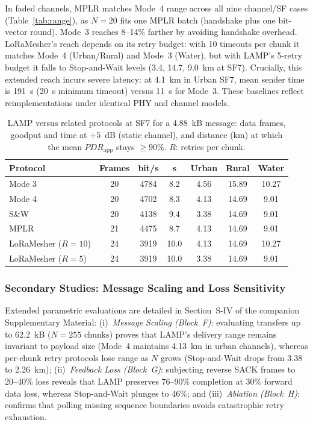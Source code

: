 \documentclass[journal]{IEEEtran}
\begin{document}
In faded channels, MPLR matches Mode~4 range across all nine channel/SF cases (Table~\ref{tab:range}), as $N=20$ fits one MPLR batch (handshake plus one bit-vector round). Mode~3 reaches 8--14\% farther by avoiding handshake overhead. LoRaMesher's reach depends on its retry budget: with 10 timeouts per chunk it matches Mode~4 (Urban/Rural) and Mode~3 (Water), but with LAMP's 5-retry budget it falls to Stop-and-Wait levels (3.4, 14.7, 9.0~km at SF7). Crucially, this extended reach incurs severe latency: at 4.1~km in Urban SF7, mean sender time is 191~s (20~s minimum timeout) versus 11~s for Mode~3. These baselines reflect reimplementations under identical PHY and channel models.

\begin{table}[htpb]
\centering
\caption{\ac{LAMP} versus related protocols at SF7 for a 4.88~kB message: data frames, goodput and time at $+5$~dB (static channel), and distance (km) at which the mean $PDR_{\mathrm{app}}$ stays $\ge 90\%$. $R$: retries per chunk.}
\label{tab:related}
\renewcommand{\arraystretch}{1.0}
\footnotesize
\setlength{\tabcolsep}{3pt}
\begin{tabular}{|l|c|c|c|c|c|c|}
\hline
\textbf{Protocol} & \textbf{Frames} & \textbf{bit/s} & \textbf{s} & \textbf{Urban} & \textbf{Rural} & \textbf{Water} \\ \hline
Mode 3 & 20 & 4784 & 8.2 & 4.56 & 15.89 & 10.27 \\ \hline
Mode 4 & 20 & 4702 & 8.3 & 4.13 & 14.69 & 9.01 \\ \hline
S\&W & 20 & 4138 & 9.4 & 3.38 & 14.69 & 9.01 \\ \hline
MPLR & 21 & 4475 & 8.7 & 4.13 & 14.69 & 9.01 \\ \hline
LoRaMesher ($R=10$) & 24 & 3919 & 10.0 & 4.13 & 14.69 & 10.27 \\ \hline
LoRaMesher ($R=5$) & 24 & 3919 & 10.0 & 3.38 & 14.69 & 9.01 \\ \hline
\end{tabular}
\end{table}

\subsubsection{Secondary Studies: Message Scaling and Loss Sensitivity}
Extended parametric evaluations are detailed in Section~S-IV of the companion Supplementary Material: (i)~\emph{Message Scaling (Block~F)}: evaluating transfers up to 62.2~kB ($N=255$ chunks) proves that LAMP's delivery range remains invariant to payload size (Mode~4 maintains 4.13~km in urban channels), whereas per-chunk retry protocols lose range as $N$ grows (Stop-and-Wait drops from 3.38 to 2.26~km); (ii)~\emph{Feedback Loss (Block~G)}: subjecting reverse SACK frames to 20--40\% loss reveals that LAMP preserves 76--90\% completion at 30\% forward data loss, whereas Stop-and-Wait plunges to 46\%; and (iii)~\emph{Ablation (Block~H)}: confirms that polling missing sequence boundaries avoids catastrophic retry exhaustion.
\end{document}
